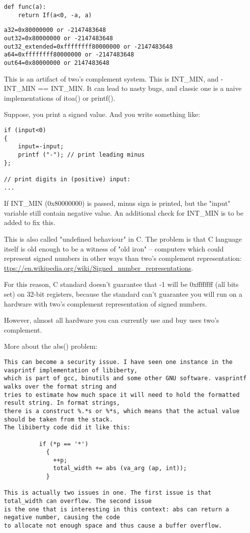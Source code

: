 \begin{lstlisting}[style=custompy]
def func(a):
    return If(a<0, -a, a)
\end{lstlisting}

\begin{lstlisting}
a32=0x80000000 or -2147483648
out32=0x80000000 or -2147483648
out32_extended=0xffffffff80000000 or -2147483648
a64=0xffffffff80000000 or -2147483648
out64=0x80000000 or 2147483648
\end{lstlisting}

This is an artifact of two's complement system.
This is INT\_MIN, and -INT\_MIN == INT\_MIN.
It can lead to nasty bugs, and classic one is a naive implementations of itoa() or printf().

Suppose, you print a signed value.
And you write something like:

\begin{lstlisting}[style=customc]
if (input<0)
{
	input=-input;
	printf ("-"); // print leading minus
};

// print digits in (positive) input:
...
\end{lstlisting}

If INT\_MIN (0x80000000) is passed, minus sign is printed, but the "input" variable still contain negative value.
An additional check for INT\_MIN is to be added to fix this.

This is also called "undefined behaviour" in C.
The problem is that C language itself is old enough to be a witness of "old iron" -- computers which could
represent signed numbers in other ways than two's complement representation:
\url{ttps://en.wikipedia.org/wiki/Signed_number_representations}.

For this reason, C standard doesn't guarantee that -1 will be 0xffffffff (all bits set) on 32-bit registers,
because the standard can't guarantee you will run on a hardware with two's complement representation of signed numbers.

However, almost all hardware you can currently use and buy uses two's complement.

More about the abs() problem:

\begin{lstlisting}
This can become a security issue. I have seen one instance in the vasprintf implementation of libiberty,
which is part of gcc, binutils and some other GNU software. vasprintf walks over the format string and 
tries to estimate how much space it will need to hold the formatted result string. In format strings, 
there is a construct %.*s or %*s, which means that the actual value should be taken from the stack. 
The libiberty code did it like this:

          if (*p == '*')
            {
              ++p;
              total_width += abs (va_arg (ap, int));
            }

This is actually two issues in one. The first issue is that total_width can overflow. The second issue 
is the one that is interesting in this context: abs can return a negative number, causing the code 
to allocate not enough space and thus cause a buffer overflow. 
\end{lstlisting}

